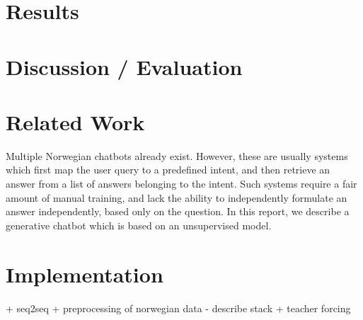 \documentclass{article}
\begin{document}
\section{Results}


\section{Discussion / Evaluation}


\section{Related Work}

Multiple Norwegian chatbots already exist. However, these are usually systems which first map
the user query to a predefined intent, and then retrieve an answer from a list of answers
belonging to the intent. Such systems require a fair amount of manual training, and lack
the ability to independently formulate an answer independently, based only on the question.
In this report, we describe a generative chatbot which is based on an unsupervised model.

\section{Implementation}

+ seq2seq
+ preprocessing of norwegian data - describe stack
+ teacher forcing

\end{document}
